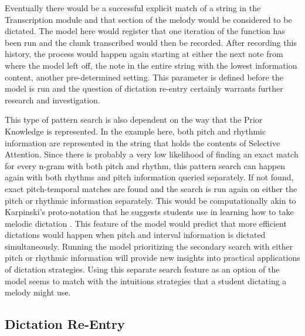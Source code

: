 \documentclass[12pt,]{book}
\begin{document}
Eventually there would be a successful explicit match of a string in the Transcription module and that section of the melody would be considered to be dictated.
The model here would register that one iteration of the function has been run and the chunk transcribed would then be recorded.
After recording this history, the process would happen again starting at either the next note from where the model left off, the note in the entire string with the lowest information content, another pre-determined setting.
This parameter is defined before the model is run and the question of dictation re-entry certainly warrants further research and investigation.

This type of pattern search is also dependent on the way that the Prior Knowledge is represented.
In the example here, both pitch and rhythmic information are represented in the string that holds the contents of Selective Attention.
Since there is probably a very low likelihood of finding an exact match for every n-gram with both pitch and rhythm, this pattern search can happen again with both rhythms and pitch information queried separately.
If not found, exact pitch-temporal matches are found and the search is run again on either the pitch or rhythmic information separately.
This would be computationally akin to Karpinski's proto-notation that he suggests students use in learning how to take melodic dictation \citep[p.88]{karpinskiAuralSkillsAcquisition2000}.
This feature of the model would predict that more efficient dictations would happen when pitch and interval information is dictated simultaneously.
Running the model prioritizing the secondary search with either pitch or rhythmic information will provide new insights into practical applications of dictation strategies.
Using this separate search feature as an option of the model seems to match with the intuitions strategies that a student dictating a melody might use.

\hypertarget{dictation-re-entry}{%
\subsection{Dictation Re-Entry}\label{dictation-re-entry}}
\end{document}
